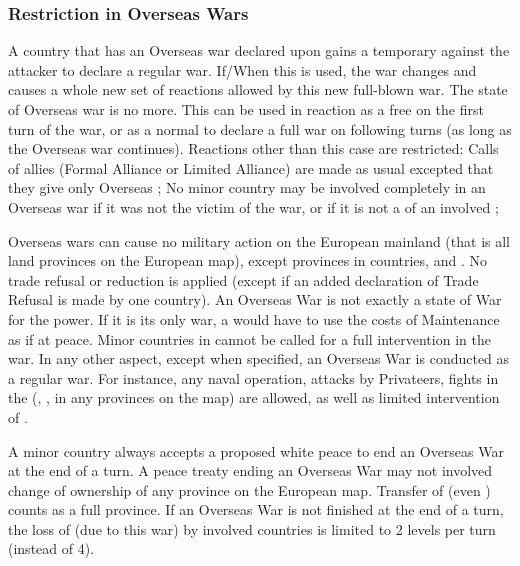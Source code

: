 \subsubsection{Restriction in Overseas Wars}
 A country that has an Overseas war declared
upon gains a temporary \CB against the attacker to declare a regular war.
\bparag If/When this \CB is used, the war changes and causes a whole new set
of reactions allowed by this new full-blown war. The state of Overseas war is
no more.
\bparag This \CB can be used in reaction as a free \CB on the first turn of
the war, or as a normal \CB to declare a full war on following turns (as long
as the Overseas war continues).
\aparag Reactions other than this case are restricted:
\bparag Calls of allies (Formal Alliance or Limited Alliance) are made as
usual excepted that they give only Overseas \CB;
\bparag No minor country may be involved completely in an Overseas war if it
was not the victim of the war, or if it is not a \VASSAL of an involved \MAJ;

\bparag Overseas wars can cause no military action on the European mainland
(that is all land provinces on the European map), except provinces in
 countries,  and .
\bparag No trade refusal or reduction is applied (except if an added
declaration of Trade Refusal is made by one country).
\bparag An Overseas War is not exactly a state of War for the power.  If it is
its only war, a \MAJ would have to use the costs of Maintenance as if at
peace.
\bparag Minor countries in \EG cannot be called for a full intervention in the
war.
\bparag In any other aspect, except when specified, an Overseas War is
conducted as a regular war. For instance, any naval operation, attacks by
Privateers, fights in the \ROTW (\COL, \TP, in any provinces on the \ROTW map)
are allowed, as well as limited intervention of \MIN.

\bparag A minor country always accepts a proposed white peace to end an
Overseas War at the end of a turn.
\bparag A peace treaty ending an Overseas War may not involved change of
ownership of any province on the European map.
\bparag Transfer of \TP (even \Facemoins) counts as a full province.
\bparag If an Overseas War is not finished at the end of a turn, the loss of
\STAB (due to this war) by involved countries is limited to 2 levels per turn
(instead of 4).



